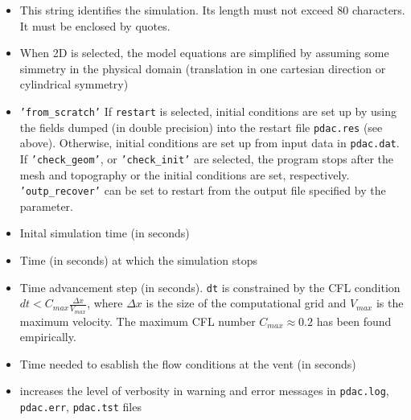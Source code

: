 \begin{itemize}
\item
{}
{This string identifies the simulation. Its length must not exceed 80 characters. It must be enclosed by quotes.}

\item
{}
{When 2D is selected, the model equations are simplified by assuming
some simmetry in the physical domain (translation in one cartesian 
direction or cylindrical symmetry)}

\item
{}
{{\tt 'from\_scratch'}}
{If {\tt restart} is selected, initial conditions are set up by using the fields
dumped (in double precision) into the restart file {\tt pdac.res} (see above). 
Otherwise, initial conditions are set up from input data in {\tt pdac.dat}.
If {\tt 'check\_geom'}, or {\tt 'check\_init'} are selected, the program stops
after the mesh and topography or the initial conditions are set, respectively.
{\tt 'outp\_recover'} can be set to restart from the output file specified
by the  parameter.} 

\item
{}
{Inital simulation time (in seconds)}

\item
{}
{Time (in seconds) at which the simulation stops}

\item
{}
{Time advancement step (in seconds). 
{\tt dt} is constrained by the CFL condition
$dt < C_{max}\frac{\Delta x}{V_{max}}$, where $\Delta x$ is
the size of the computational grid and $V_{max}$ is the maximum
velocity. The maximum CFL number $C_{max}\approx 0.2$ has been 
found empirically.}

\item
{}
{Time needed to esablish the flow conditions at the vent (in seconds)}

\item
{}
{increases the level of verbosity in warning and error messages 
in {\tt pdac.log}, {\tt pdac.err}, {\tt pdac.tst} files}


\end{itemize}
